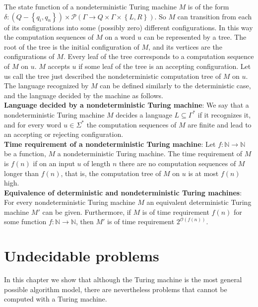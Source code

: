 \documentclass[margin=0px]{article}
\begin{document}
The state function of a nondeterministic Turing machine $M$ is of the form
$\delta : (Q - \left\{q_{i},q_{n}\right\}) \times \mathcal{P}(\Gamma \to Q \times \Gamma \times \left\{L, R\right\})$.
So $M$ can transition from each of its configurations into some (possibly zero) different configurations.
In this way the computation sequences of $M$ on a word $u$ can be represented by a tree. The root of the tree is the initial configuration of $M$,
and its vertices are the configurations of $M$. Every leaf of the tree corresponds to a computation sequence of $M$ on
$u$. $M$ accepts $u$ if some leaf of the tree is an accepting configuration.
Let us call the tree just described the nondeterministic computation tree of $M$ on
$u$. The language recognized by $M$ can be defined similarly to the deterministic case,
and the language decided by the machine as follows.\\

\noindent \textbf{Language decided by a nondeterministic Turing machine}: We say that a nondeterministic
Turing machine $M$ decides a language $L \subseteq \Gamma^{*}$ if it recognizes it, and for every word $u \in \Sigma^{*}$
the computation sequences of $M$ are finite and lead to an accepting or rejecting configuration.\\

\noindent \textbf{Time requirement of a nondeterministic Turing machine}: Let $f : \mathbb{N} \to \mathbb{N}$ be a function, $M$
a nondeterministic Turing machine. The time requirement of $M$ is $f(n)$ if on an input $u$ of length $n$ there are no
computation sequences of $M$ longer than $f(n)$, that is, the computation tree of $M$ on $u$ is at most $f(n)$ high.\\

\noindent \textbf{Equivalence of deterministic and nondeterministic Turing machines}:
For every nondeterministic Turing machine $M$ an equivalent deterministic Turing machine $M'$ can be given.
Furthermore, if $M$ is of time requirement $f(n)$ for some function $f : \mathbb{N} \to \mathbb{N}$, then
$M'$ is of time requirement $2^{\mathcal{O}(f(n))}$.


\section{Undecidable problems}

In this chapter we show that although the Turing machine is the most general possible
algorithm model, there are nevertheless problems that cannot be computed with a Turing machine.\\
\end{document}
